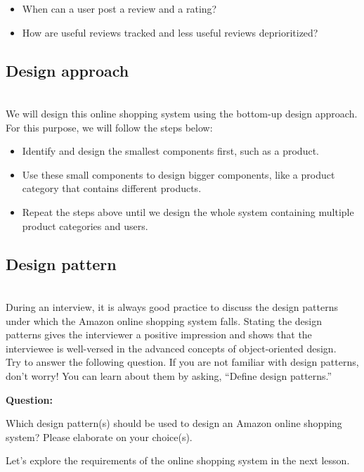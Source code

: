 \begin{itemize}
\item
\protect{}\label{C43doTbiaDLxg0IhkTeAG}
When can a user post a review and a rating?
\item
\protect{}\label{1vtYO4Y7qcCGmowDxbgpK}
How are useful reviews tracked and less useful reviews deprioritized?
\end{itemize}

\subsection{Design approach}\label{sMw8unB4kHlXZCwiPVhJ1}
\\
We will design this online shopping system using the bottom-up design approach. For this purpose, we will follow the steps below:

\begin{itemize}
\item
\protect{}\label{D8wvZxSCuIon1N5vE34I-}
Identify and design the smallest components first, such as a product.
\item
\protect{}\label{yNe1qzXP8Iz7JOfH5-2QE}
Use these small components to design bigger components, like a product category that contains different products.
\item
Repeat the steps above until we design the whole system containing multiple product categories and users.
\end{itemize}

\subsection{Design pattern~}\label{gY9SBs0IidJWM770RFDjk}
\\
During an interview, it is always good practice to discuss the design patterns under which the Amazon online shopping system falls. Stating the design patterns gives the interviewer a positive impression and shows that the interviewee is well-versed in the advanced concepts of object-oriented design.
\\
Try to answer the following question. If you are not familiar with design patterns, don't worry! You can learn about them by asking, ``Define design patterns.''

\textbf{Question:}

Which design pattern(s) should be used to design an Amazon online shopping system? Please elaborate on your choice(s).

Let's explore the requirements of the online shopping system in the next lesson.

